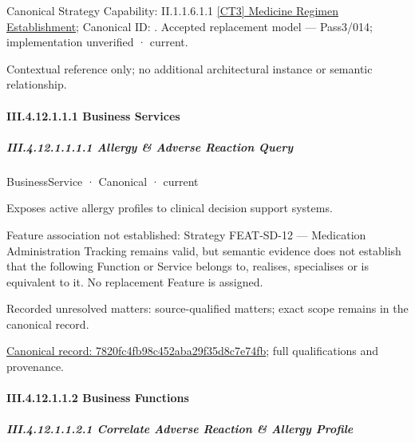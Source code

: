 {\small Canonical Strategy Capability: II.1.1.6.1.1 \hyperref[element:d0510b19ab734149b0f5f8b0ef16d40e]{[CT3] Medicine Regimen Establishment}; Canonical ID: \texttt{}. Accepted replacement model — Pass3/014; implementation unverified · current.}\par
Contextual reference only; no additional architectural instance or semantic relationship.\par
\paragraph*{III.4.12.1.1.1 Business Services}
\label{navigation:III.4.12.1.1.1}

\subparagraph*{III.4.12.1.1.1.1 Allergy \& Adverse Reaction Query}
\label{navigation:III.4.12.1.1.1.1}

\label{element:7820fc4fb98c452aba29f35d8c7e74fb}
{\small BusinessService · Canonical · current}\par

Exposes active allergy profiles to clinical decision support systems.



Feature association not established: Strategy FEAT-SD-12 — Medication Administration Tracking remains valid, but semantic evidence does not establish that the following Function or Service belongs to, realises, specialises or is equivalent to it. No replacement Feature is assigned.


{\small Recorded unresolved matters: source-qualified matters; exact scope remains in the canonical record.}\par
{\footnotesize \href{../../../../../../../continuum/business/business-service/7820fc4fb98c452aba29f35d8c7e74fb.md}{Canonical record: 7820fc4fb98c452aba29f35d8c7e74fb}; full qualifications and provenance.}\par
\paragraph*{III.4.12.1.1.2 Business Functions}
\label{navigation:III.4.12.1.1.2}

\subparagraph*{III.4.12.1.1.2.1 Correlate Adverse Reaction \& Allergy Profile}
\label{navigation:III.4.12.1.1.2.1}

